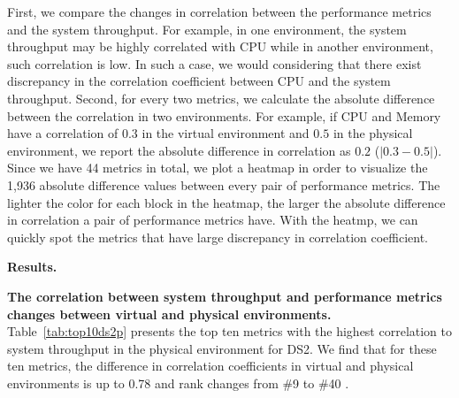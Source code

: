 First, we compare the changes in correlation between the performance metrics and the system throughput. For example, in one environment, the system throughput may be highly correlated with CPU while in another environment, such correlation is low. In such a case, we would considering that there exist discrepancy in the correlation coefficient between CPU and the system throughput. Second, for every two metrics, we calculate the absolute difference between the correlation in two environments. For example, if CPU and Memory have a correlation of $0.3$ in the virtual environment and $0.5$ in the physical environment, we report the absolute difference in correlation as $0.2$ ($|0.3-0.5|$). Since we have 44 metrics in total, we plot a heatmap in order to visualize the 1,936 absolute difference values between every pair of performance metrics. The lighter the color for each block in the heatmap, the larger the absolute difference in correlation a pair of performance metrics have. With the heatmp, we can quickly spot the metrics that have large discrepancy in correlation coefficient. 





\noindent \textbf{Results.}

\noindent \textbf{The correlation between system throughput and performance metrics changes between virtual and physical environments.} Table~\ref{tab:top10ds2p} presents the top ten metrics with the highest correlation to system throughput in the physical environment for DS2. We find that for these ten metrics, the difference in correlation coefficients in virtual and physical environments is up to 0.78 and rank changes from \#9 to \#40 .

